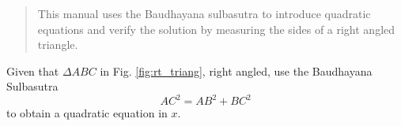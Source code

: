 \documentclass[journal,12pt,twocolumn]{IEEEtran}
\begin{document}
%

\bigskip

\begin{abstract}
This manual uses the Baudhayana sulbasutra to introduce quadratic equations and verify the solution by measuring the sides of
a right angled triangle.
\end{abstract}
%
%
\begin{problem}
Given that $\Delta ABC$ in Fig. \ref{fig:rt_triang}, right angled, use the Baudhayana Sulbasutra 
\begin{equation}
\label{eq:baudhayana}
AC^2 = AB^2 + BC^2
\end{equation}
to obtain a quadratic equation in $x$.
\end{problem}
\end{document}
